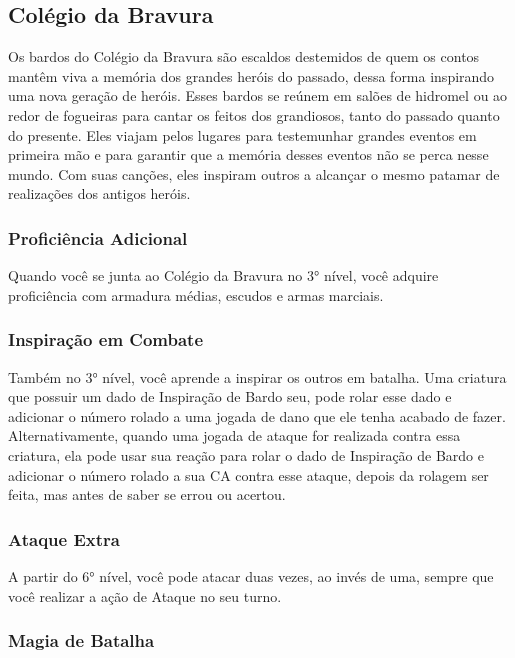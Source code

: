 \documentclass{RPG_Adventure}[2021/10/20]
\begin{document}
\subsection{Colégio da Bravura}%
\label{sub:colegio_da_bravura}

Os bardos do Colégio da Bravura são escaldos destemidos de quem os contos mantêm
viva a memória dos grandes heróis do passado, dessa forma inspirando uma nova
geração de heróis. Esses bardos se reúnem em salões de hidromel ou ao redor de
fogueiras para cantar os feitos dos grandiosos, tanto do passado quanto do
presente. Eles viajam pelos lugares para testemunhar grandes eventos em primeira
mão e para garantir que a memória desses eventos não se perca nesse mundo. Com
suas canções, eles inspiram outros a alcançar o mesmo patamar de realizações dos
antigos heróis.

\subsubsection{Proficiência Adicional}%
\label{ssub:proficiencia_adicional}

Quando você se junta ao Colégio da Bravura no 3° nível, você adquire
proficiência com armadura médias, escudos e armas marciais.

\subsubsection{Inspiração em Combate}%
\label{ssub:inspiracao_em_combate}

Também no 3° nível, você aprende a inspirar os outros em batalha. Uma criatura
que possuir um dado de Inspiração de Bardo seu, pode rolar esse dado e adicionar
o número rolado a uma jogada de dano que ele tenha acabado de fazer.
Alternativamente, quando uma jogada de ataque for realizada contra essa
criatura, ela pode usar sua reação para rolar o dado de Inspiração de Bardo e
adicionar o número rolado a sua CA contra esse ataque, depois da rolagem ser
feita, mas antes de saber se errou ou acertou.

\subsubsection{Ataque Extra}%
\label{ssub:ataque_extra}

A partir do 6° nível, você pode atacar duas vezes, ao invés de uma, sempre que
você realizar a ação de Ataque no seu turno.

\subsubsection{Magia de Batalha}%
\label{ssub:magia_de_batalha}
\end{document}
